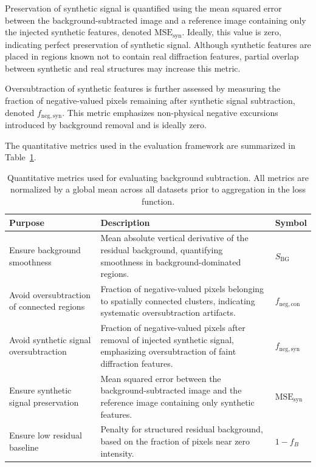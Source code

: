 \documentclass[iucr]{iucrjournals}
\begin{document}
Preservation of synthetic signal is quantified using the mean squared error between the background-subtracted image and a reference image containing only the injected synthetic features, denoted $\mathrm{MSE}_{\mathrm{syn}}$. Ideally, this value is zero, indicating perfect preservation of synthetic signal.
Although synthetic features are placed in regions known not to contain real diffraction features, partial overlap between synthetic and real structures may increase this metric.

Oversubtraction of synthetic features is further assessed by measuring the fraction of negative-valued pixels remaining after synthetic signal subtraction, denoted $f_{\mathrm{neg,syn}}$. This metric emphasizes non-physical negative excursions introduced by background removal and is ideally zero.

The quantitative metrics used in the evaluation framework are summarized in Table~\ref{tab:loss_terms}.

\begin{table}[t]
\caption{Quantitative metrics used for evaluating background subtraction. 
All metrics are normalized by a global mean across all datasets prior to aggregation in the loss function.}
\label{tab:loss_terms}
\centering
\small
\setlength{\tabcolsep}{6pt}
\renewcommand{\arraystretch}{1.1}
\begin{tabular}{@{}p{3.5cm}p{9.0cm}p{1.5cm}@{}}
\toprule
\textbf{Purpose} & \textbf{Description} & \textbf{Symbol} \\
\midrule
Ensure background smoothness  & Mean absolute vertical derivative of the residual background, quantifying smoothness in background-dominated regions. & $S_{\mathrm{BG}}$ \\
Avoid oversubtraction of connected regions & Fraction of negative-valued pixels belonging to spatially connected clusters, indicating systematic oversubtraction artifacts. & $f_{\mathrm{neg,con}}$ \\
Avoid synthetic signal oversubtraction & Fraction of negative-valued pixels after removal of injected synthetic signal, emphasizing oversubtraction of faint diffraction features. & $f_{\mathrm{neg,syn}}$ \\
Ensure synthetic signal preservation & Mean squared error between the background-subtracted image and the reference image containing only synthetic features.& $\mathrm{MSE}_{\mathrm{syn}}$  \\
Ensure low residual baseline & Penalty for structured residual background, based on the fraction of pixels near zero intensity. & $1 - f_{B}$ \\
\bottomrule
\end{tabular}
\end{table}
\end{document}
